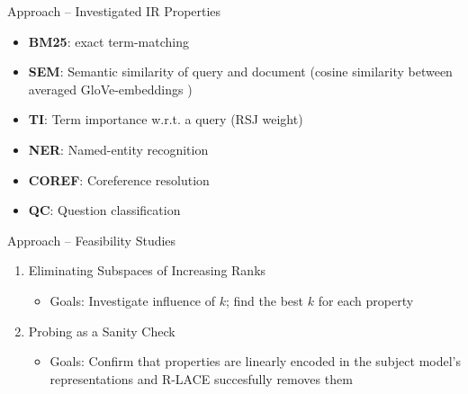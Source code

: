 \documentclass[aspectratio=169]{beamer}
\begin{document}
\begin{frame}{Approach -- Investigated IR Properties}
    \begin{itemize}
        \item \textbf{BM25}: exact term-matching \cite{bm25} \cite{Robertson1994OkapiAT}
        \item \textbf{SEM}: Semantic similarity of query and document (cosine similarity between averaged GloVe-embeddings \cite{GloVe})
        \item \textbf{TI}: Term importance w.r.t. a query (RSJ weight) \cite{Robertson-Relevance-1976,Formal__match_your_words}
        \item \textbf{NER}: Named-entity recognition
        \item \textbf{COREF}: Coreference resolution
        \item \textbf{QC}: Question classification
    \end{itemize}
\end{frame}

\begin{frame}{Approach -- Feasibility Studies}
    \begin{enumerate}
        \item Eliminating Subspaces of Increasing Ranks
              \begin{itemize}
                  \item Goals: Investigate influence of $k$; find the best $k$ for each property
              \end{itemize}
        \item Probing as a Sanity Check
              \begin{itemize}
                  \item Goals: Confirm that properties are linearly encoded in the subject model's representations and R-LACE succesfully removes them
              \end{itemize}
    \end{enumerate}
\end{frame}
\end{document}

